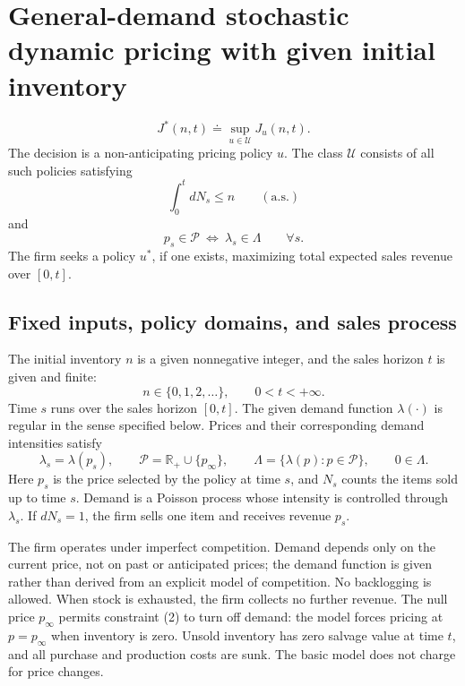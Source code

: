 \documentclass{article}
\begin{document}
\section*{General-demand stochastic dynamic pricing with given initial inventory}

\begin{equation}
J^*(n,t)\doteq\sup_{u\in\mathcal U}J_u(n,t).
\tag{7}
\end{equation}
The decision is a non-anticipating pricing policy $u$. The class $\mathcal U$ consists of all such policies satisfying
\begin{equation}
\int_0^t dN_s\leq n\qquad(\mathrm{a.s.})
\tag{2}
\end{equation}
and
\begin{equation}
p_s\in\mathcal P\ \Longleftrightarrow\ \lambda_s\in\Lambda
\qquad\forall s.
\tag{3}
\end{equation}
The firm seeks a policy $u^*$, if one exists, maximizing total expected sales revenue over $[0,t]$.

\subsection*{Fixed inputs, policy domains, and sales process}
The initial inventory $n$ is a given nonnegative integer, and the sales horizon $t$ is given and finite:
\[
n\in\{0,1,2,\ldots\},\qquad 0<t<+\infty.
\]
Time $s$ runs over the sales horizon $[0,t]$. The given demand function $\lambda(\cdot)$ is regular in the sense specified below. Prices and their corresponding demand intensities satisfy
\[
\lambda_s=\lambda(p_s),\qquad
\mathcal P=\mathbb R_+\cup\{p_\infty\},\qquad
\Lambda=\{\lambda(p):p\in\mathcal P\},\qquad
0\in\Lambda.
\]
Here $p_s$ is the price selected by the policy at time $s$, and $N_s$ counts the items sold up to time $s$. Demand is a Poisson process whose intensity is controlled through $\lambda_s$. If $dN_s=1$, the firm sells one item and receives revenue $p_s$.

The firm operates under imperfect competition. Demand depends only on the current price, not on past or anticipated prices; the demand function is given rather than derived from an explicit model of competition. No backlogging is allowed. When stock is exhausted, the firm collects no further revenue. The null price $p_\infty$ permits constraint (2) to turn off demand: the model forces pricing at $p=p_\infty$ when inventory is zero. Unsold inventory has zero salvage value at time $t$, and all purchase and production costs are sunk. The basic model does not charge for price changes.
\end{document}
